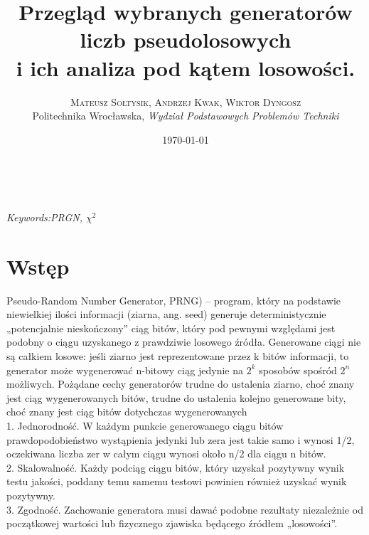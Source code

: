 \documentclass[a4paper, 11pt]{article} %
\title{\textbf{Przegląd wybranych generatorów liczb pseudolosowych}\\ %
i ich analiza pod kątem losowości.} %
\author{\textsc{Mateusz Sołtysik, Andrzej Kwak, Wiktor Dyngosz} %
\\{Politechnika Wrocławska, \textit{Wydział Podstawowych Problemów Techniki}}} %
\date{\today} %
\makeatletter
\renewcommand{\maketitle}{ %
\begin{flushright} %
{\LARGE\@title} %

\vspace{50pt} %

{\large\@author} %
\\\@date %

\vspace{40pt} %
\end{flushright}
}
\makeatother
\begin{document}
\maketitle %



\begin{abstract}
\end{abstract}

\hspace*{3,6mm}\textit{Keywords:PRGN,  $\chi^2$} 

\vspace{30pt} %

\section*{Wstęp}
Pseudo-Random Number Generator, PRNG) – program, który na podstawie niewielkiej ilości informacji (ziarna, ang. seed) generuje deterministycznie „potencjalnie nieskończony” ciąg
bitów, który pod pewnymi względami jest podobny o ciągu uzyskanego z prawdziwie losowego źródła. Generowane ciągi nie są całkiem losowe: jeśli ziarno jest reprezentowane przez k bitów informacji, to generator może wygenerować n-bitowy ciąg jedynie na $2^k$ sposobów spośród $2^n$ możliwych.
Pożądane cechy generatorów trudne do ustalenia ziarno, choć znany jest ciąg wygenerowanych bitów, trudne do ustalenia kolejno generowane bity, choć znany jest ciąg bitów dotychczas wygenerowanych 
\\1. Jednorodność. W każdym punkcie generowanego ciągu bitów prawdopodobieństwo wystąpienia jedynki lub zera jest takie samo i wynosi 1/2, oczekiwana liczba zer w całym ciągu wynosi około n/2 dla ciągu n bitów.
\\2. Skalowalność. Każdy podciąg ciągu bitów, który uzyskał pozytywny wynik testu jakości, poddany temu samemu testowi powinien również uzyskać wynik pozytywny.
\\3. Zgodność. Zachowanie generatora musi dawać podobne rezultaty niezależnie od początkowej wartości lub fizycznego zjawiska będącego źródłem „losowości”.
\end{document}
